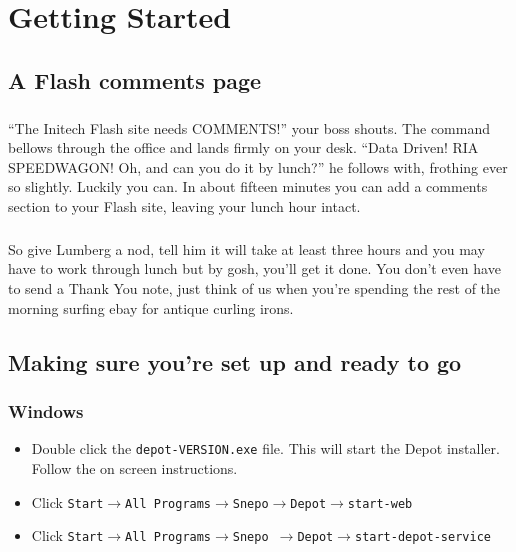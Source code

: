 \documentclass[12pt]{report}
\begin{document}
\setlength{\headsep}{16pt}

\tableofcontents

\chapter{Getting Started}
\section{A Flash comments page}

\paragraph{}
``The Initech Flash site needs COMMENTS!'' your boss shouts. The
command bellows through the office and lands firmly on your
desk. ``Data Driven! RIA SPEEDWAGON! Oh, and can you do it by lunch?''
he follows with, frothing ever so slightly. Luckily you can. In about
fifteen minutes you can add a comments section to your Flash site,
leaving your lunch hour intact.
\paragraph{}
So give Lumberg a nod, tell him it will take at least three hours and
you may have to work through lunch but by gosh, you'll get it
done. You don't even have to send a Thank You note, just think of us
when you're spending the rest of the morning surfing ebay for antique
curling irons.

\section{Making sure you're set up and ready to go}

\subsection{Windows}
\begin{itemize}
\item Double click the \texttt{depot-VERSION.exe} file. This will start the
  Depot installer. Follow the on screen instructions.
\item Click \texttt{Start$\rightarrow$All Programs$\rightarrow$Snepo$\rightarrow$Depot$\rightarrow$start-web}
\item Click \texttt{Start$\rightarrow$All Programs$\rightarrow$Snepo
$\rightarrow$Depot$\rightarrow$start-depot-service}
\end{itemize}
\end{document}
